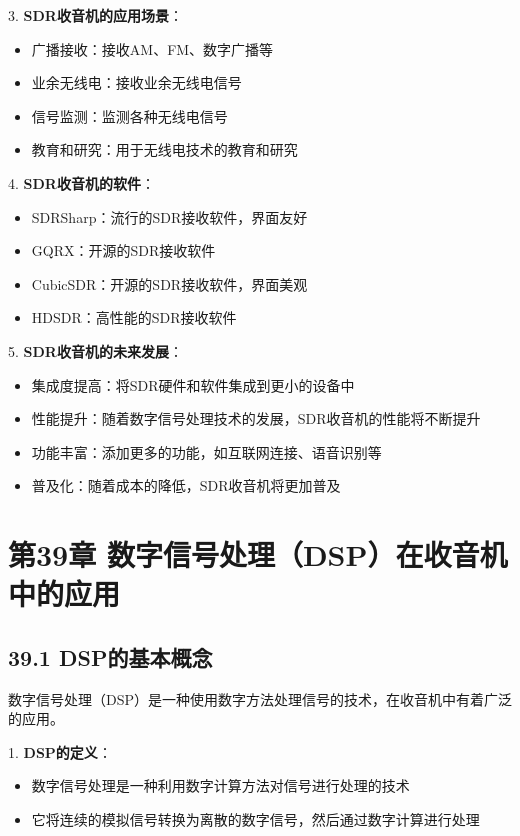 \documentclass[12pt,UTF8]{ctexbook}
\begin{document}
3. \textbf{SDR收音机的应用场景}：
   \begin{itemize}[leftmargin=3.5em]
   \item 广播接收：接收AM、FM、数字广播等
   \item 业余无线电：接收业余无线电信号
   \item 信号监测：监测各种无线电信号
   \item 教育和研究：用于无线电技术的教育和研究
   \end{itemize}

4. \textbf{SDR收音机的软件}：
   \begin{itemize}[leftmargin=3.5em]
   \item SDRSharp：流行的SDR接收软件，界面友好
   \item GQRX：开源的SDR接收软件
   \item CubicSDR：开源的SDR接收软件，界面美观
   \item HDSDR：高性能的SDR接收软件
   \end{itemize}

5. \textbf{SDR收音机的未来发展}：
   \begin{itemize}[leftmargin=3.5em]
   \item 集成度提高：将SDR硬件和软件集成到更小的设备中
   \item 性能提升：随着数字信号处理技术的发展，SDR收音机的性能将不断提升
   \item 功能丰富：添加更多的功能，如互联网连接、语音识别等
   \item 普及化：随着成本的降低，SDR收音机将更加普及
   \end{itemize}

\chapter*{第39章 数字信号处理（DSP）在收音机中的应用}
\section*{39.1 DSP的基本概念}

数字信号处理（DSP）是一种使用数字方法处理信号的技术，在收音机中有着广泛的应用。

1. \textbf{DSP的定义}：
   \begin{itemize}[leftmargin=3.5em]
   \item 数字信号处理是一种利用数字计算方法对信号进行处理的技术
   \item 它将连续的模拟信号转换为离散的数字信号，然后通过数字计算进行处理
   \end{itemize}
\end{document}
